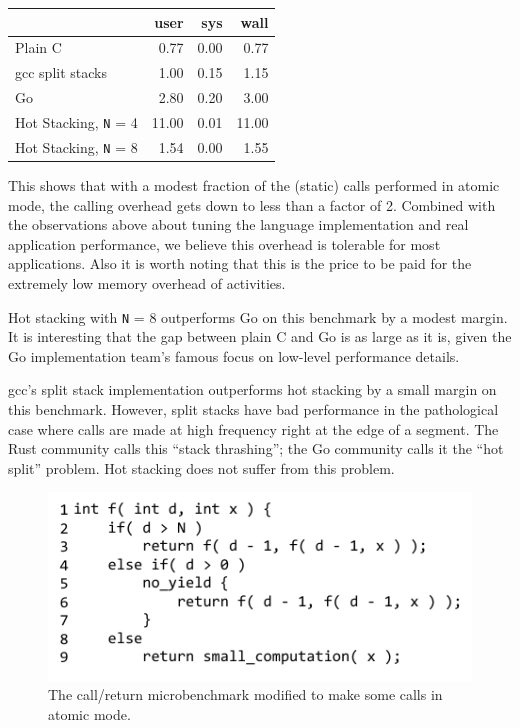 \documentclass[9pt,preprint]{sigplanconf}
\begin{document}
\vspace{1em}
\begin{tabular}{|l|r|r|r|}
  \hline
   & user & sys & wall \\
  \hline
  \hline
  Plain C & 0.77 & 0.00 & 0.77 \\
  \hline
  gcc split stacks\footnotemark{} & 1.00 & 0.15 & 1.15 \\
  \hline
  Go & 2.80 & 0.20 & 3.00 \\
  \hline
  Hot Stacking, \texttt{N} = 4 & 11.00 & 0.01 & 11.00 \\
  \hline
  Hot Stacking, \texttt{N} = 8 & 1.54 & 0.00 & 1.55 \\
  \hline
\end{tabular}
\vspace{1em}


This shows that with a modest fraction of the (static) calls performed in atomic mode, the calling overhead gets down to less than a factor of 2.
Combined with the observations above about tuning the language implementation and real application performance, we believe this overhead is tolerable for most applications.
Also it is worth noting that this is the price to be paid for the extremely low memory overhead of activities.

Hot stacking with \texttt{N} = 8 outperforms Go on this benchmark by a modest margin.
It is interesting that the gap between plain C and Go is as large as it is, given the Go implementation team's famous focus on low-level performance details.

gcc's split stack implementation outperforms hot stacking by a small margin on this benchmark.
However, split stacks have bad performance in the pathological case where calls are made at high frequency right at the edge of a segment.
The Rust community calls this ``stack thrashing''; the Go community calls it the ``hot split'' problem.
Hot stacking does not suffer from this problem.

\begin{figure}
\includegraphics{just_calling_n_benchmark}
\caption{The call/return microbenchmark modified to make some calls in atomic mode.}
\label{fig:micro_calling_n}
\end{figure}
\end{document}
